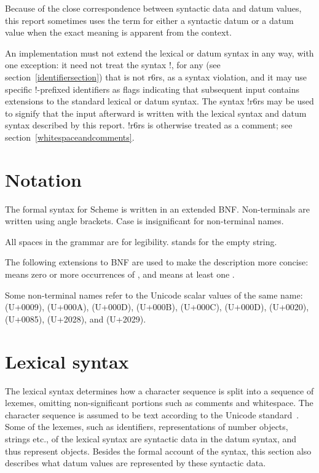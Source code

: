 Because of the close correspondence between syntactic data and datum
values, this report sometimes uses the term  for
either a syntactic datum or a datum value when the exact meaning
is apparent from the context.

An implementation must not extend the lexical or datum syntax in
any way, with one exception: it need not treat the syntax
{\cf \sharpsign{}!}, for any  (see
section~\ref{identifiersection}) that is not {\cf r6rs}, as a syntax
violation, and it may use specific {\cf \sharpsign{}!}-prefixed
identifiers as flags indicating that subsequent input contains extensions
to the standard lexical or datum syntax. 
The syntax {\cf \sharpsign{}!r6rs} may be used to signify that
the input afterward is written with the lexical syntax and
datum syntax described by
this report.
{\cf \sharpsign{}!r6rs} is otherwise treated as a comment; see section~\ref{whitespaceandcomments}.

\section{Notation}
\label{BNF}

The formal syntax for Scheme is written in an extended BNF.
Non-terminals are written using angle brackets.  Case is insignificant
for non-terminal names.

All spaces in the grammar are for legibility.
 stands for the empty string.

The following extensions to BNF are used to make the description more
concise:   means zero or more occurrences of
, and  means at least one
.

Some non-terminal names refer to the Unicode scalar values of the same
name:  (U+0009),  (U+000A),
 (U+000D),  (U+000B),
 (U+000C),  (U+000D),
 (U+0020),  (U+0085),  (U+2028), and  (U+2029).

\section{Lexical syntax}
\label{lexicalsyntaxsection}

The lexical syntax determines how a character sequence is split into a
sequence of lexemes, omitting non-significant portions
such as comments and whitespace.  The character sequence is assumed to
be text according to the Unicode standard~\cite{Unicode}.  Some of
the lexemes, such as identifiers, representations of number objects, strings etc., of the lexical
syntax are syntactic data in the datum syntax, and thus represent objects.
Besides the formal account of the syntax, this section also describes
what datum values are represented by these syntactic data.

